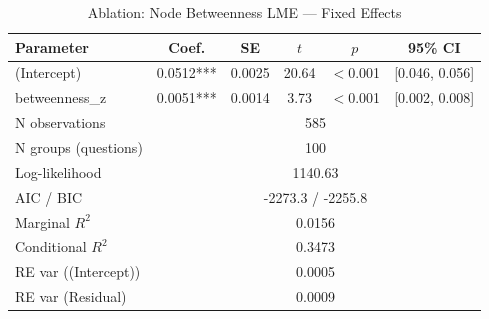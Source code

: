 \begin{table}[htbp]
\centering
\small
\caption{Ablation: Node Betweenness LME --- Fixed Effects}
\label{tab:lme_ablation_betw_table}
\begin{tabular}{lccccc}
\toprule
Parameter & Coef. & SE & $t$ & $p$ & 95\% CI \\
\midrule
  (Intercept) & 0.0512*** & 0.0025 & 20.64 & $<$0.001 & [0.046, 0.056] \\
  betweenness\_z & 0.0051*** & 0.0014 & 3.73 & $<$0.001 & [0.002, 0.008] \\
\midrule
  N observations & \multicolumn{5}{c}{585} \\
  N groups (questions) & \multicolumn{5}{c}{100} \\
  Log-likelihood & \multicolumn{5}{c}{1140.63} \\
  AIC / BIC & \multicolumn{5}{c}{-2273.3 / -2255.8} \\
  Marginal $R^2$ & \multicolumn{5}{c}{0.0156} \\
  Conditional $R^2$ & \multicolumn{5}{c}{0.3473} \\
  RE var ((Intercept)) & \multicolumn{5}{c}{0.0005} \\
  RE var (Residual) & \multicolumn{5}{c}{0.0009} \\
\bottomrule
\end{tabular}
\end{table}
